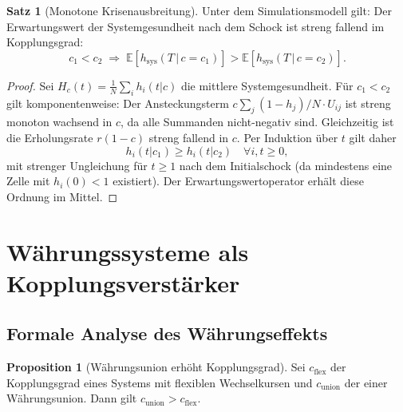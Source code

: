 ﻿\documentclass[a4paper,12pt]{article}
\theoremstyle{definition}
\newtheorem{satz}{Satz}
\newtheorem{proposition}{Proposition}
\begin{document}
\begin{satz}[Monotone Krisenausbreitung]
\label{satz:monoton}
    Unter dem Simulationsmodell gilt: Der Erwartungswert der Systemgesundheit nach dem
    Schock ist streng fallend im Kopplungsgrad:
    \[
        c_1 < c_2 \;\Rightarrow\; \mathbb{E}[h_{\text{sys}}(T\,|\,c=c_1)]
        > \mathbb{E}[h_{\text{sys}}(T\,|\,c=c_2)].
    \]
\end{satz}

\begin{proof}
    Sei $H_c(t) = \frac{1}{N}\sum_i h_i(t|c)$ die mittlere Systemgesundheit. Für
    $c_1 < c_2$ gilt komponentenweise: Der Ansteckungsterm
    $c\sum_j (1-h_j)/N \cdot U_{ij}$ ist streng monoton wachsend in $c$, da alle
    Summanden nicht-negativ sind. Gleichzeitig ist die Erholungsrate $r(1-c)$ streng
    fallend in $c$. Per Induktion über $t$ gilt daher
    \[
        h_i(t|c_1) \geq h_i(t|c_2) \quad \forall i, t \geq 0,
    \]
    mit strenger Ungleichung für $t \geq 1$ nach dem Initialschock (da mindestens eine
    Zelle mit $h_i(0) < 1$ existiert). Der Erwartungswertoperator erhält diese Ordnung
    im Mittel.
\end{proof}

\section{Währungssysteme als Kopplungsverstärker}

\subsection{Formale Analyse des Währungseffekts}

\begin{proposition}[Währungsunion erhöht Kopplungsgrad]
\label{prop:waehrung}
    Sei $c_{\text{flex}}$ der Kopplungsgrad eines Systems mit flexiblen Wechselkursen
    und $c_{\text{union}}$ der einer Währungsunion. Dann gilt
    $c_{\text{union}} > c_{\text{flex}}$.
\end{proposition}
\end{document}
